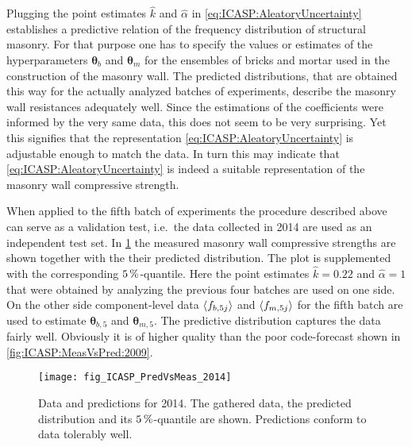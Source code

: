 Plugging the point estimates \(\hat{k}\) and \(\hat{\alpha}\) in \cref{eq:ICASP:AleatoryUncertainty} establishes a predictive relation of the frequency distribution of structural masonry.
For that purpose one has to specify the values or estimates of the hyperparameters \(\bm{\theta}_b\) and \(\bm{\theta}_m\) for the ensembles of bricks and mortar used in the construction of the masonry wall.
The predicted distributions, that are obtained this way for the actually analyzed batches of experiments, describe the masonry wall resistances adequately well.
Since the estimations of the coefficients were informed by the very same data, this does not seem to be very surprising.
Yet this signifies that the representation \cref{eq:ICASP:AleatoryUncertainty} is adjustable enough to match the data.
In turn this may indicate that \cref{eq:ICASP:AleatoryUncertainty} is indeed a suitable representation of the masonry wall compressive strength.
\par %
When applied to the fifth batch of experiments the procedure described above can serve as a validation test, i.e.\ the data collected in 2014 are used as an independent test set.
In \cref{fig:ICASP:MeasVsPred:2014} the measured masonry wall compressive strengths are shown together with the their predicted distribution.
The plot is supplemented with the corresponding \(\unit[5]{\%}\)-quantile.
Here the point estimates \(\hat{k}=0.22\) and \(\hat{\alpha}=1\) that were obtained by analyzing the previous four batches are used on one side.
On the other side component-level data \(\langle{f_{b,5j}}\rangle\) and \(\langle{f_{m,5j}}\rangle\) for the fifth batch are used to estimate \(\bm{\theta}_{b,5}\) and \(\bm{\theta}_{m,5}\).
The predictive distribution captures the data fairly well.
Obviously it is of higher quality than the poor code-forecast shown in \cref{fig:ICASP:MeasVsPred:2009}.
\begin{figure}[ht]
  \centering
  \texttt{[image: fig\_ICASP\_PredVsMeas\_2014]}
  \caption[Data and predictions for 2014]{Data and predictions for 2014.
           The gathered data, the predicted distribution and its \(\unit[5]{\%}\)-quantile are shown.
           Predictions conform to data tolerably well.
          }
  \label{fig:ICASP:MeasVsPred:2014}
\end{figure}